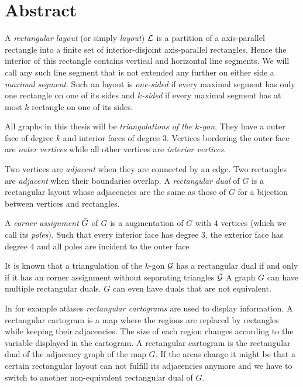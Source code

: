 
\section*{Abstract}
\thispagestyle{plain}

  A  \emph{rectangular layout} (or simply \emph{layout}) $\mathcal{L}$ is a partition of a axis-parallel rectangle into a finite set of interior-disjoint axis-parallel rectangles. Hence the interior of this rectangle contains vertical and horizontal line segments. We will call any such line segment that is not extended any further on either side a \emph{maximal segment}. Such an layout is \emph{one-sided} if every maximal segment has only one rectangle on one of its sides and \emph{$k$-sided} if every maximal segment has at most $k$ rectangle on one of its sides.

  All graphs in this thesis will be \emph{triangulations of the $k$-gon}. They have a outer face of degree $k$ and interior faces of degree $3$.
  Vertices bordering the outer face are \emph{outer vertices} while all other vertices are \emph{interior vertices}.

  Two vertices are \emph{adjacent} when they are connected by an edge. Two rectangles are \emph{adjacent} when their boundaries overlap. A \emph{rectangular dual} of $G$ is a rectangular layout whose adjacencies are the same as those of $G$ for a bijection between vertices and rectangles.

  A \emph{corner assignment} $\bar{G}$ of $G$ is a augmentation of $G$ with $4$ vertices (which we call its \emph{poles}). Such that every interior face has degree $3$, the exterior face has degree $4$ and all poles are incident to the outer face


  It is known that a triangulation of the $k$-gon $\mathcal{G}$ has a rectangular dual if and only if it has an corner assignment without separating triangles $\bar{\mathcal{G}}$
  A graph $G$ can have multiple rectangular duals. $G$ can even have duals that are not equivalent.

  In for example atlases \emph{rectangular cartograms} are used to display information. A rectangular cartogram is a map where the regions are replaced by rectangles while keeping their adjacencies. The size of each region changes according to the variable displayed in the cartogram.  A rectangular cartogram is the rectangular dual of the adjacency graph of the map $G$.
  If the areas change it might be that a certain rectangular layout can not fulfill its adjacencies anymore and we have to switch to another non-equivalent rectangular dual of $G$.

